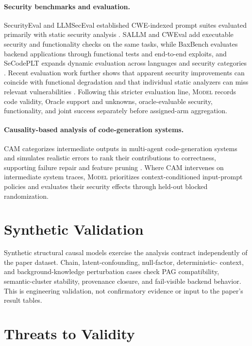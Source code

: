 \documentclass[acmsmall,screen,review,anonymous]{acmart}
\newcommand{\model}{\textsc{Model}\xspace}
\begin{document}
\paragraph{Security benchmarks and evaluation.}
SecurityEval and LLMSecEval established CWE-indexed prompt suites evaluated
primarily with static security analysis
\cite{siddiq2022securityeval,tony2023llmseceval}.
SALLM and CWEval add executable security and functionality checks on the same
tasks, while BaxBench evaluates backend applications through functional tests
and end-to-end exploits, and SeCodePLT expands dynamic evaluation across
languages and security categories
\cite{siddiq2024sallm,peng2025cweval,vero2025baxbench,
nie2025secodeplt}.
Recent evaluation work further shows that apparent security improvements can
coincide with functional degradation and that individual static analyzers can
miss relevant vulnerabilities \cite{dai2026rethinking}.
Following this stricter evaluation line, \model records code validity, Oracle
support and unknowns, oracle-evaluable security, functionality, and joint
success separately before assigned-arm aggregation.

\paragraph{Causality-based analysis of code-generation systems.}
CAM categorizes intermediate outputs in multi-agent code-generation systems
and simulates realistic errors to rank their contributions to correctness,
supporting failure repair and feature pruning \cite{lyu2026cam}.
Where CAM intervenes on intermediate system traces, \model prioritizes
context-conditioned input-prompt policies and evaluates their security effects
through held-out blocked randomization.

\section{Synthetic Validation}

Synthetic structural causal models exercise the analysis contract independently
of the paper dataset. Chain, latent-confounding, null-factor, deterministic-
context, and background-knowledge perturbation cases check PAG compatibility,
semantic-cluster stability, provenance closure, and fail-visible backend
behavior. This is engineering validation, not confirmatory evidence or input
to the paper's result tables.

\section{Threats to Validity}
\end{document}
